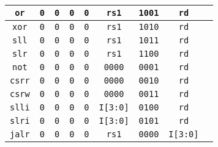 \documentclass[a4paper]{article}
\begin{document}
\begin{table}[!h]
\begin{tabular}{c c c c c c c c c}
\multicolumn{1}{|c|}{\texttt{or}} & \texttt{0} & \texttt{0} & \texttt{0} & \texttt{0} & \multicolumn{1}{|c|}{\texttt{rs1}} & \texttt{1001} & \multicolumn{1}{|c|}{\texttt{rd}}\\ \hline

\multicolumn{1}{|c|}{\texttt{xor}} & \texttt{0} & \texttt{0} & \texttt{0} & \texttt{0} & \multicolumn{1}{|c|}{\texttt{rs1}} & \texttt{1010} & \multicolumn{1}{|c|}{\texttt{rd}}\\ \hline

\multicolumn{1}{|c|}{\texttt{sll}} & \texttt{0} & \texttt{0} & \texttt{0} & \texttt{0} & \multicolumn{1}{|c|}{\texttt{rs1}} & \texttt{1011} & \multicolumn{1}{|c|}{\texttt{rd}} \\ \hline

\multicolumn{1}{|c|}{\texttt{slr}} & \texttt{0} & \texttt{0} & \texttt{0} & \texttt{0} & \multicolumn{1}{|c|}{\texttt{rs1}} & \texttt{1100} & \multicolumn{1}{|c|}{\texttt{rd}} \\ \hline \hline

\multicolumn{1}{|c|}{\texttt{not}} & \texttt{0} & \texttt{0} & \texttt{0} & \texttt{0} & \multicolumn{1}{|c|}{\texttt{0000}} & \texttt{0001} & \multicolumn{1}{|c|}{\texttt{rd}} \\ \hline

\multicolumn{1}{|c|}{\texttt{csrr}} & \texttt{0} & \texttt{0} & \texttt{0} & \texttt{0} & \multicolumn{1}{|c|}{\texttt{0000}} & \texttt{0010} & \multicolumn{1}{|c|}{\texttt{rd}} \\ \hline

\multicolumn{1}{|c|}{\texttt{csrw}} & \texttt{0} & \texttt{0} & \texttt{0} & \texttt{0} & \multicolumn{1}{|c|}{\texttt{0000}} & \texttt{0011} & \multicolumn{1}{|c|}{\texttt{rd}} \\ \hline

\multicolumn{1}{|c|}{\texttt{slli}} & \texttt{0} & \texttt{0} & \texttt{0} & \texttt{0} & \multicolumn{1}{|c|}{\texttt{I[3:0]}} & \texttt{0100} & \multicolumn{1}{|c|}{\texttt{rd}}\\ \hline

\multicolumn{1}{|c|}{\texttt{slri}} & \texttt{0} & \texttt{0} & \texttt{0} & \texttt{0} & \multicolumn{1}{|c|}{\texttt{I[3:0]}} & \texttt{0101} & \multicolumn{1}{|c|}{\texttt{rd}}\\ \hline \hline

\multicolumn{1}{|c|}{\texttt{jalr}} & \texttt{0} & \texttt{0} & \texttt{0} & \texttt{0} & \multicolumn{1}{|c|}{\texttt{rs1}} & \texttt{0000} & \multicolumn{1}{|c|}{\texttt{I[3:0]}}\\ \hline
\end{tabular}
\end{table}
\end{document}
